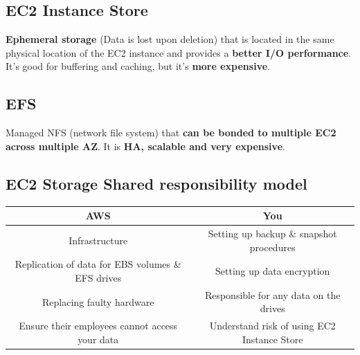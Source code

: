 \subsection{EC2 Instance Store}\label{subsec:ec2-instance-store}
\textbf{Ephemeral storage} (Data is lost upon deletion) that is located in the same physical location of the EC2 instance and provides a \textbf{better I/O performance}.
It's good for buffering and caching, but it's \textbf{more expensive}.

\subsection{EFS}\label{subsec:efs}
Managed NFS (network file system) that \textbf{can be bonded to multiple EC2 across multiple AZ}.
It is \textbf{HA, scalable and very expensive}.

\pagebreak

\subsection{EC2 Storage Shared responsibility model}\label{subsec:ec2-storage-shared-responsibility-model}
\begin{table}[h]
	\centering
	\begin{tabular}{||c c||}
		\hline
		\multicolumn{1}{||c|}{\textbf{AWS}}                                			& \textbf{You} \\ \hline
		\multicolumn{1}{||c|}{Infrastructure}    									& Setting up backup \& snapshot procedures \\ \hline
		\multicolumn{1}{||c|}{Replication of data for EBS volumes \& EFS drives}    & Setting up data encryption \\ \hline
		\multicolumn{1}{||c|}{Replacing faulty hardware}                   			& Responsible for any data on the drives \\ \hline
		\multicolumn{1}{||c|}{Ensure their employees cannot access your data}       & Understand risk of using EC2 Instance Store \\ \hline
	\end{tabular}
	\newline\newline
	\label{tab:ec2-storage-shared-responsibility-model-table}
\end{table}

